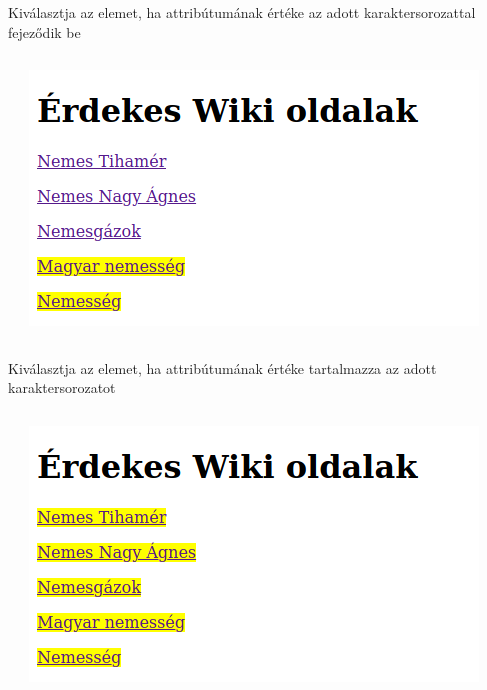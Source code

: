 \begin{frame}
  Kiválasztja az elemet, ha attribútumának értéke az adott karaktersorozattal fejeződik be
  \begin{columns}[c]
      \begin{exampleblock}{}
      \fontsize{7}{8} \selectfont
      
      
  \end{exampleblock}
      \includegraphics[width=\textwidth]{attributum6.png}
  \end{columns}
\end{frame}

\begin{frame}
  Kiválasztja az elemet, ha attribútumának értéke tartalmazza az adott karaktersorozatot
  \begin{columns}[c]
      \begin{exampleblock}{}
      \fontsize{7}{8} \selectfont
      
      
  \end{exampleblock}
      \includegraphics[width=\textwidth]{attributum7.png}
  \end{columns}
\end{frame}

